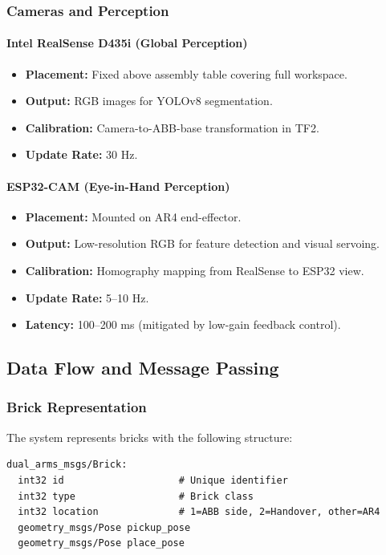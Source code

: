 \subsubsection{Cameras and Perception}

\paragraph{Intel RealSense D435i (Global Perception)}
\begin{itemize}
    \item \textbf{Placement:} Fixed above assembly table covering full workspace.
    \item \textbf{Output:} RGB images for YOLOv8 segmentation.
    \item \textbf{Calibration:} Camera-to-ABB-base transformation in TF2.
    \item \textbf{Update Rate:} 30 Hz.
\end{itemize}

\paragraph{ESP32-CAM (Eye-in-Hand Perception)}
\begin{itemize}
    \item \textbf{Placement:} Mounted on AR4 end-effector.
    \item \textbf{Output:} Low-resolution RGB for feature detection and visual servoing.
    \item \textbf{Calibration:} Homography mapping from RealSense to ESP32 view.
    \item \textbf{Update Rate:} 5--10 Hz.
    \item \textbf{Latency:} 100--200 ms (mitigated by low-gain feedback control).
\end{itemize}

\subsection{Data Flow and Message Passing}

\subsubsection{Brick Representation}

The system represents bricks with the following structure:
\begin{verbatim}
dual_arms_msgs/Brick:
  int32 id                    # Unique identifier
  int32 type                  # Brick class
  int32 location              # 1=ABB side, 2=Handover, other=AR4
  geometry_msgs/Pose pickup_pose
  geometry_msgs/Pose place_pose
\end{verbatim}

